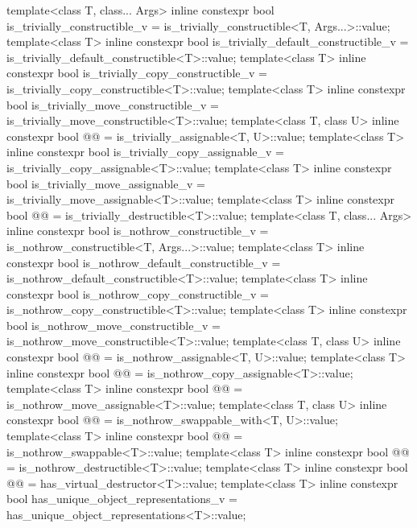 \begin{codeblock}
{  template<class T, class... Args>
    inline constexpr bool is_trivially_constructible_v
      = is_trivially_constructible<T, Args...>::value;
  template<class T>
    inline constexpr bool is_trivially_default_constructible_v
      = is_trivially_default_constructible<T>::value;
  template<class T>
    inline constexpr bool is_trivially_copy_constructible_v
      = is_trivially_copy_constructible<T>::value;
  template<class T>
    inline constexpr bool is_trivially_move_constructible_v
      = is_trivially_move_constructible<T>::value;
  template<class T, class U>
    inline constexpr bool @@ = is_trivially_assignable<T, U>::value;
  template<class T>
    inline constexpr bool is_trivially_copy_assignable_v
      = is_trivially_copy_assignable<T>::value;
  template<class T>
    inline constexpr bool is_trivially_move_assignable_v
      = is_trivially_move_assignable<T>::value;
  template<class T>
    inline constexpr bool @@ = is_trivially_destructible<T>::value;
  template<class T, class... Args>
    inline constexpr bool is_nothrow_constructible_v
      = is_nothrow_constructible<T, Args...>::value;
  template<class T>
    inline constexpr bool is_nothrow_default_constructible_v
      = is_nothrow_default_constructible<T>::value;
  template<class T>
    inline constexpr bool is_nothrow_copy_constructible_v
    = is_nothrow_copy_constructible<T>::value;
  template<class T>
    inline constexpr bool is_nothrow_move_constructible_v
      = is_nothrow_move_constructible<T>::value;
  template<class T, class U>
    inline constexpr bool @@ = is_nothrow_assignable<T, U>::value;
  template<class T>
    inline constexpr bool @@ = is_nothrow_copy_assignable<T>::value;
  template<class T>
    inline constexpr bool @@ = is_nothrow_move_assignable<T>::value;
  template<class T, class U>
    inline constexpr bool @@ = is_nothrow_swappable_with<T, U>::value;
  template<class T>
    inline constexpr bool @@ = is_nothrow_swappable<T>::value;
  template<class T>
    inline constexpr bool @@ = is_nothrow_destructible<T>::value;
  template<class T>
    inline constexpr bool @@ = has_virtual_destructor<T>::value;
  template<class T>
    inline constexpr bool has_unique_object_representations_v
      = has_unique_object_representations<T>::value;

}
\end{codeblock}
